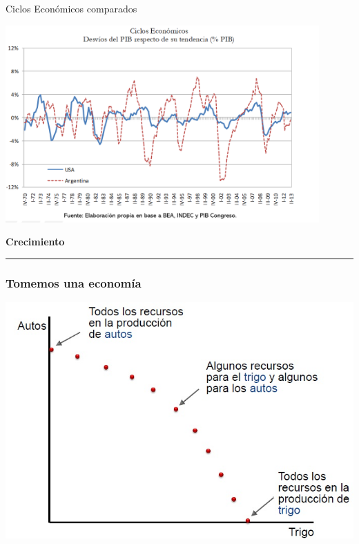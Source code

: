 \documentclass{beamer}
\begin{document}
\begin{frame}{Ciclos Económicos comparados}

\centering\includegraphics[width=12cm]{Slides Principios de Economia/Figures/P12.png}\

\end{frame}

\begin{frame}{}
\centering\huge\textbf{Crecimiento} 
\vspace{2mm}
\hrule
\end{frame}

\begin{frame}
\frametitle{Tomemos una economía}
\begin{center}
    \includegraphics[scale=0.6]{Slides Principios de Economia/Tema_11.2_tomemosunaeconomia.jpg}
\end{center}
\end{frame}
\end{document}
